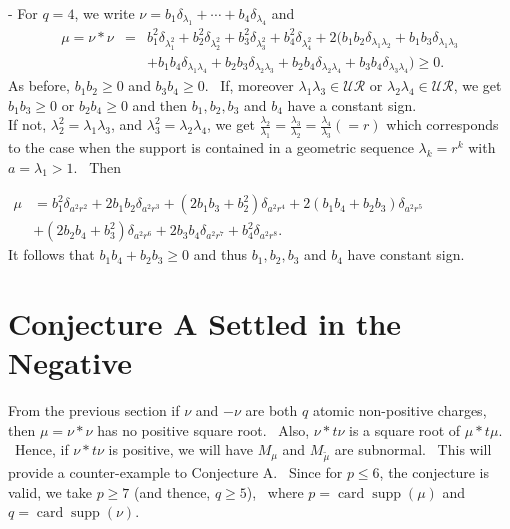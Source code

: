 \documentclass[12pt]{amsart}
\newcommand{\supp}{\operatorname{supp}}
\newcommand{\card}{\operatorname{card}}
\begin{document}
\begin{itemize}
- For $q = 4$, we write $\nu = b_1\delta_{\lambda_1}+\cdots+b_4\delta_{\lambda_4}$ and 
$$
\begin{array}{ccl}
    \mu = \nu *\nu  & =& b_1^2\delta_{\lambda_1^2}+ b_2^2\delta_{\lambda_2^2}+b_3^2\delta_{\lambda_3^2}+b_4^2\delta_{\lambda_4^2}
+2(b_1b_2\delta_{\lambda_1\lambda_2}+b_1b_3\delta_{\lambda_1\lambda_3} \\
     & & +
b_1b_4\delta_{\lambda_1\lambda_4}+b_2b_3\delta_{\lambda_2\lambda_3} +b_2b_4\delta_{\lambda_2\lambda_4}+
b_3b_4\delta_{\lambda_3\lambda_4})\ge 0.
\end{array}
$$ 
As before, $b_1b_2\ge 0$ and $b_3b_4\ge 0$. \ If, moreover $ \lambda_1\lambda_3\in \mathcal{UR}$ or $ \lambda_2\lambda_4\in \mathcal{UR}$, we get $b_1b_3\ge 0$ or $b_2b_4\ge 0$ and then $b_1,b_2,b_3$ and $b_4$  have a constant sign.\\
If not, $ \lambda_2^2=\lambda_1\lambda_3$,  and  $ \lambda_3^2=\lambda_2\lambda_4$, we get $\frac{\lambda_2}{\lambda_1}= \frac{\lambda_3}{\lambda_2}=\frac{\lambda_4}{\lambda_3} (=r)$  which corresponds to the case when the support is contained in a geometric sequence $\lambda_k=r^k$ with $a=\lambda_1>1$. \  Then 

$
\begin{array}{ll}
    \mu & = b_1^2\delta_{a^2r^2}+2b_1b_2\delta_{a^2r^3}+(2b_1b_3+b_2^2)\delta_{a^2r^4}+
2(b_1b_4+b_2b_3)\delta_{a^2r^5} \\
     & + (2b_2b_4 + b_3^2)\delta_{a^2r^6}+2b_3b_4\delta_{a^2r^7}+b_4^2\delta_{a^2r^8}.
\end{array}
$\\

It follows that $ b_1b_4+b_2b_3\ge 0$ and thus $b_1,b_2,b_3$ and $b_4$ have constant sign. \ 
\end{itemize}


\section{Conjecture A Settled in the Negative}

From the previous section if $\nu$ and $-\nu$  are both $q$ atomic non-positive charges, then $\mu=\nu*\nu $ has no positive square root. \ Also, $\nu*t\nu$  is a square root of $\mu*t\mu$. \ Hence, if   $\nu*t\nu$ is positive, we will have $M_\mu$ and $M_{\tilde{\mu}}$ are subnormal. \ This will provide a counter-example to Conjecture A. \ Since for $p\le 6$, the conjecture is valid, we take $p\ge 7$  (and thence, $q\ge 5$), \ where  $p=\card \supp(\mu)$ and $q=\card \supp(\nu)$.\\
\end{document}
